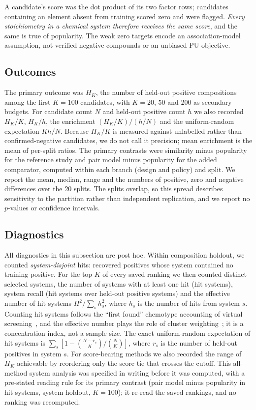 \documentclass[11pt,a4paper]{article}
\begin{document}
A candidate's score was the dot product of its two factor rows; candidates containing an element absent from training scored zero and were flagged. \emph{Every stoichiometry in a chemical system therefore receives the same score}, and the same is true of popularity. The weak zero targets encode an association-model assumption, not verified negative compounds or an unbiased PU objective.

\subsection{Outcomes}
The primary outcome was $H_K$, the number of held-out positive compositions among the first $K=100$ candidates, with $K=20$, 50 and 200 as secondary budgets. For candidate count $N$ and held-out positive count $h$ we also recorded $H_K/K$, $H_K/h$, the enrichment $(H_K/K)/(h/N)$ and the uniform-random expectation $Kh/N$. Because $H_K/K$ is measured against unlabelled rather than confirmed-negative candidates, we do not call it precision; mean enrichment is the mean of per-split ratios. The primary contrasts were similarity minus popularity for the reference study and pair model minus popularity for the added comparator, computed within each branch (design and policy) and split. We report the mean, median, range and the numbers of positive, zero and negative differences over the 20 splits. The splits overlap, so this spread describes sensitivity to the partition rather than independent replication, and we report no $p$-values or confidence intervals.

\subsection{Diagnostics}
All diagnostics in this subsection are post hoc. Within composition holdout, we counted \emph{system-disjoint} hits: recovered positives whose system contained no training positive. For the top $K$ of every saved ranking we then counted distinct selected systems, the number of systems with at least one hit (hit systems), system recall (hit systems over held-out positive systems) and the effective number of hit systems $H^2/\sum_s h_s^2$, where $h_s$ is the number of hits from system $s$. Counting hit systems follows the ``first found'' chemotype accounting of virtual screening~\citep{mackey2009}, and the effective number plays the role of cluster weighting~\citep{clark2008}; it is a concentration index, not a sample size. The exact uniform-random expectation of hit systems is $\sum_s[1-\binom{N-r_s}{K}/\binom{N}{K}]$, where $r_s$ is the number of held-out positives in system $s$. For score-bearing methods we also recorded the range of $H_K$ achievable by reordering only the score tie that crosses the cutoff. This all-method system analysis was specified in writing before it was computed, with a pre-stated reading rule for its primary contrast (pair model minus popularity in hit systems, system holdout, $K=100$); it re-read the saved rankings, and no ranking was recomputed.
\end{document}
